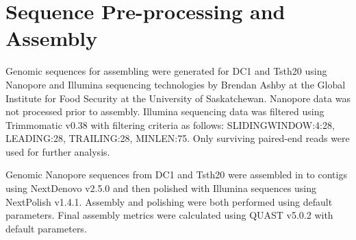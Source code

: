 \section{Sequence Pre-processing and Assembly}
\label{met:seq-process}

Genomic sequences for assembling were generated for DC1 and Tsth20
using Nanopore\cite{Wang2021} and Illumina\cite{Bennett2004}
sequencing technologies by Brendan Ashby at the Global Institute for
Food Security at the University of Saskatchewan. Nanopore data was not
processed prior to assembly. Illumina sequencing data was filtered
using Trimmomatic v0.38\cite{Bolger2014} with filtering criteria as
follows: SLIDINGWINDOW:4:28, LEADING:28, TRAILING:28, MINLEN:75. Only
surviving paired-end reads were used for further analysis.

Genomic Nanopore sequences from DC1 and Tsth20 were assembled in to
contigs using NextDenovo\cite{Hu2024} v2.5.0 and then polished with
Illumina sequences using NextPolish\cite{Hu2020} v1.4.1. Assembly and
polishing were both performed using default parameters. Final assembly
metrics were calculated using QUAST v5.0.2\cite{Gurevich2013} with
default parameters.





